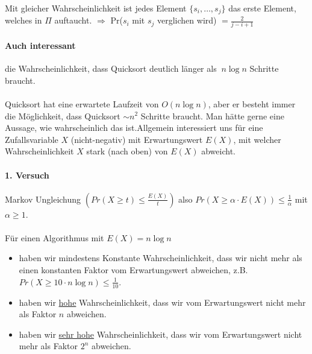 
\paragraph*{} Mit gleicher Wahrscheinlichkeit ist jedes Element $\{ s_i,\dots,s_j \}$ das erste Element, welches in $\Pi$ auftaucht. $\Rightarrow$ Pr($s_i$ mit $s_j$ verglichen wird) $= \frac{2}{j-i+1}$

\paragraph*{Auch interessant} die Wahrscheinlichkeit, dass Quicksort deutlich länger als $~n \log n$ Schritte braucht.


\paragraph*{} Quicksort hat eine erwartete Laufzeit von $O(n \log n)$, aber er besteht immer die Möglichkeit, dass Quicksort $\sim n^2$ Schritte braucht. Man hätte gerne eine Aussage, wie wahrscheinlich das ist.Allgemein interessiert uns für eine Zufallsvariable $X$ (nicht-negativ) mit Erwartungswert $E(X)$, mit welcher Wahrscheinlichkeit $X$ stark (nach oben) von $E(X)$ abweicht.

\paragraph*{1. Versuch} Markov Ungleichung $(Pr(X \geq t) \leq \frac{E(X)}{t})$ also $Pr(X \geq \alpha \cdot E(X)) \leq \frac{1}{\alpha}$ mit $\alpha \geq 1$.

\paragraph*{} Für einen Algorithmus mit $E(X) = n \log n$
\begin{itemize}
	\item haben wir mindestens Konstante Wahrscheinlichkeit, dass wir nicht mehr als einen konstanten Faktor vom Erwartungswert abweichen, z.B. $Pr(X \geq 10 \cdot n \log n) \leq \frac{1}{10}$.
	\item haben wir \underline{hohe} Wahrscheinlichkeit, dass wir vom Erwartungswert nicht mehr als Faktor $n$ abweichen.
	\item haben wir \underline{sehr hohe} Wahrscheinlichkeit, dass wir vom Erwartungswert nicht mehr als Faktor $2^n$ abweichen.
\end{itemize}

